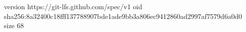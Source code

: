 version https://git-lfs.github.com/spec/v1
oid sha256:8a32400c18fff137788907bde1ade9bb3a806ec9412860ad2997af7579d6a0d0
size 68
